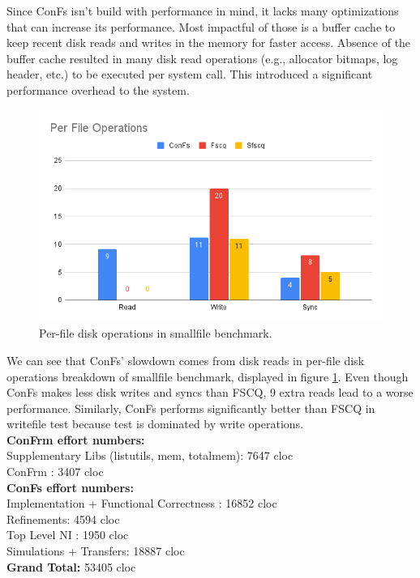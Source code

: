 Since ConFs isn't build with performance in mind, it lacks many optimizations that can increase its performance. Most impactful of those is a buffer cache to keep recent disk reads and writes in the memory for faster access. Absence of the buffer cache resulted in many disk read operations (e.g., allocator bitmaps, log header, etc.) to be executed per system call. This introduced a significant performance overhead to the system. 

\begin{figure}[H]
    \centering
    \includegraphics[scale=0.5]{templates/figures/Per File Operations.png}
    \caption{Per-file disk operations in smallfile benchmark.}
    \label{fig:Smallfile_Per_File_benchmark}
\end{figure}

We can see that ConFs' slowdown comes from disk reads in per-file disk operations breakdown of smallfile benchmark, displayed in figure  \ref{fig:Smallfile_Per_File_benchmark}. Even though ConFs makes less disk writes and syncs than FSCQ, 9 extra reads lead to a worse performance. Similarly, ConFs performs significantly better than FSCQ in writefile test because test is dominated by write operations.\\

\noindent
\textbf{ConFrm effort numbers:}\\
Supplementary Libs (listutils, mem, totalmem): 7647 cloc\\
ConFrm : 3407 cloc\\
\noindent
\textbf{ConFs effort numbers:}\\
Implementation + Functional Correctness : 16852 cloc\\
Refinements: 4594 cloc\\
Top Level NI : 1950 cloc\\
Simulations + Transfers: 18887 cloc\\
\noindent
\textbf{Grand Total:} 53405 cloc
